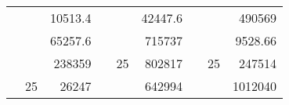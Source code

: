 \begin{table}[H]
\begin{tabular}{|ccrccrccc}
\rowcolor[HTML]{DAE8FC} 
\multicolumn{1}{|c|}{\cellcolor[HTML]{FFFFC7}}                                & \multicolumn{1}{c|}{\cellcolor[HTML]{DAE8FC}}                      & \multicolumn{1}{r|}{\cellcolor[HTML]{DAE8FC}10513.4}   & \multicolumn{1}{c|}{\cellcolor[HTML]{FFFFC7}}                                & \multicolumn{1}{c|}{\cellcolor[HTML]{DAE8FC}}                       & \multicolumn{1}{r|}{\cellcolor[HTML]{DAE8FC}42447.6}   & \multicolumn{1}{c|}{\cellcolor[HTML]{FFFFC7}}                                & \multicolumn{1}{c|}{\cellcolor[HTML]{DAE8FC}}                      & \multicolumn{1}{r|}{\cellcolor[HTML]{DAE8FC}490569}    \\ \cline{3-3} \cline{6-6} \cline{9-9} 
\multicolumn{1}{|c|}{\cellcolor[HTML]{FFFFC7}}                                & \multicolumn{1}{c|}{\cellcolor[HTML]{DAE8FC}}                      & \multicolumn{1}{r|}{\cellcolor[HTML]{DDFDFF}65257.6}   & \multicolumn{1}{c|}{\cellcolor[HTML]{FFFFC7}}                                & \multicolumn{1}{c|}{\cellcolor[HTML]{DAE8FC}}                       & \multicolumn{1}{r|}{\cellcolor[HTML]{DDFDFF}715737}    & \multicolumn{1}{c|}{\cellcolor[HTML]{FFFFC7}}                                & \multicolumn{1}{c|}{\cellcolor[HTML]{DAE8FC}}                      & \multicolumn{1}{r|}{\cellcolor[HTML]{DDFDFF}9528.66}   \\ \cline{3-3} \cline{6-6} \cline{9-9} 
\rowcolor[HTML]{DAE8FC} 
\multicolumn{1}{|c|}{\cellcolor[HTML]{FFFFC7}}                                & \multicolumn{1}{c|}{\cellcolor[HTML]{DAE8FC}}                      & \multicolumn{1}{r|}{\cellcolor[HTML]{DAE8FC}238359}    & \multicolumn{1}{c|}{\cellcolor[HTML]{FFFFC7}}                                & \multicolumn{1}{c|}{\multirow{-9}{*}{\cellcolor[HTML]{DAE8FC}25}}   & \multicolumn{1}{r|}{\cellcolor[HTML]{DAE8FC}802817}    & \multicolumn{1}{c|}{\cellcolor[HTML]{FFFFC7}}                                & \multicolumn{1}{c|}{\multirow{-9}{*}{\cellcolor[HTML]{DAE8FC}25}}  & \multicolumn{1}{r|}{\cellcolor[HTML]{DAE8FC}247514}    \\ \cline{3-3} \cline{5-6} \cline{8-9} 
\multicolumn{1}{|c|}{\cellcolor[HTML]{FFFFC7}}                                & \multicolumn{1}{c|}{\multirow{-10}{*}{\cellcolor[HTML]{DAE8FC}25}} & \multicolumn{1}{r|}{\cellcolor[HTML]{DDFDFF}26247}     & \multicolumn{1}{c|}{\cellcolor[HTML]{FFFFC7}}                                & \multicolumn{1}{c|}{\cellcolor[HTML]{DDFDFF}}                       & \multicolumn{1}{r|}{\cellcolor[HTML]{DAE8FC}642994}    & \multicolumn{1}{c|}{\cellcolor[HTML]{FFFFC7}}                                & \multicolumn{1}{c|}{\cellcolor[HTML]{DDFDFF}}                      & \multicolumn{1}{r|}{\cellcolor[HTML]{DAE8FC}1012040}   \\ \cline{2-3} \cline{6-6} \cline{9-9} 

\end{tabular}
\end{table}
